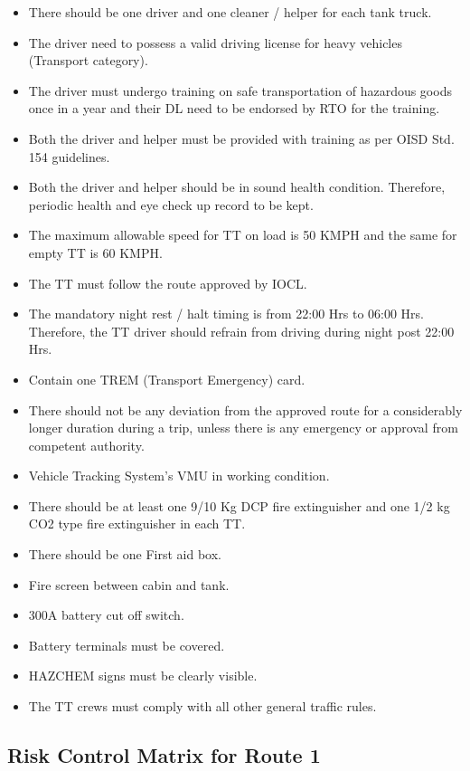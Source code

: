 \documentclass[paper=letter, fontsize=12pt]{article}
\begin{document}
\begin{itemize}
    \item There should be one driver and one cleaner / helper for each tank truck.
    \item The driver need to possess a valid driving license for heavy vehicles (Transport category).
    \item The driver must undergo training on safe transportation of hazardous goods once in a year and their DL need to be endorsed by RTO for the training.
    \item Both the driver and helper must be provided with training as per OISD Std. 154 guidelines.
    \item Both the driver and helper should be in sound health condition. Therefore, periodic health and eye check up record to be kept.
    \item The maximum allowable speed for TT on load is 50 KMPH and the same for empty TT is 60 KMPH.
    \item The TT must follow the route approved by IOCL.
    \item The mandatory night rest / halt timing is from 22:00 Hrs to 06:00 Hrs. Therefore, the TT driver should refrain from driving during night post 22:00 Hrs.
    \item Contain one TREM (Transport Emergency) card.
    \item There should not be any deviation from the approved route for a considerably longer duration during a trip, unless there is any emergency or approval from competent authority.
    \item Vehicle Tracking System's VMU in working condition.
    \item There should be at least one 9/10 Kg DCP fire extinguisher and one 1/2 kg CO2 type fire extinguisher in  each TT.
    \item There should be one First aid box.
    \item Fire screen between cabin and tank.
    \item 300A battery cut off switch.
    \item Battery terminals must be covered.
    \item HAZCHEM signs must be clearly visible.
    \item The TT crews must comply with all other general traffic rules.
\end{itemize}


\subsection{Risk Control Matrix for Route 1}
\end{document}
